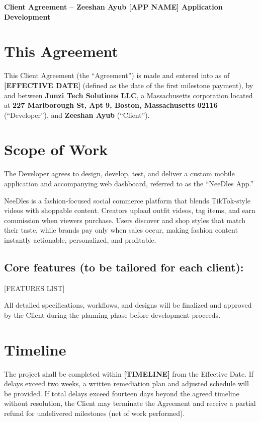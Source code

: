 \documentclass[11pt,letterpaper]{article}
\newcommand{\ClientName}{Zeeshan Ayub}
\newcommand{\AppName}{[APP NAME]}
\newcommand{\EffectiveDate}{[EFFECTIVE DATE]}
\newcommand{\TimeLine}{[TIMELINE]}
\newcommand{\FeaturesListPlaceholder}{[FEATURES LIST]}
\begin{document}
\begin{center}
\Large\textbf{Client Agreement -- \ClientName{} \AppName{} Application Development}
\end{center}

\vspace{1em}

\section*{This Agreement}
This Client Agreement (the ``Agreement'') is made and entered into as of \textbf{\EffectiveDate{}} (defined as the date of the first milestone payment), by and between \textbf{Junzi Tech Solutions LLC}, a Massachusetts corporation located at \textbf{227 Marlborough St, Apt 9, Boston, Massachusetts 02116} (``Developer''), and \textbf{\ClientName{}} (``Client'').

\section{Scope of Work}
The Developer agrees to design, develop, test, and deliver a custom mobile application and accompanying web dashboard, referred to as the ``NeeDles App.''

NeeDles is a fashion-focused social commerce platform that blends TikTok-style videos with shoppable content. Creators upload outfit videos, tag items, and earn commission when viewers purchase. Users discover and shop styles that match their taste, while brands pay only when sales occur, making fashion content instantly actionable, personalized, and profitable.

\subsection*{Core features (to be tailored for each client):}
\FeaturesListPlaceholder{}

All detailed specifications, workflows, and designs will be finalized and approved by the Client during the planning phase before development proceeds.

\section{Timeline}
The project shall be completed within \textbf{\TimeLine{}} from the Effective Date. If delays exceed two weeks, a written remediation plan and adjusted schedule will be provided. If total delays exceed fourteen days beyond the agreed timeline without resolution, the Client may terminate the Agreement and receive a partial refund for undelivered milestones (net of work performed).
\end{document}

